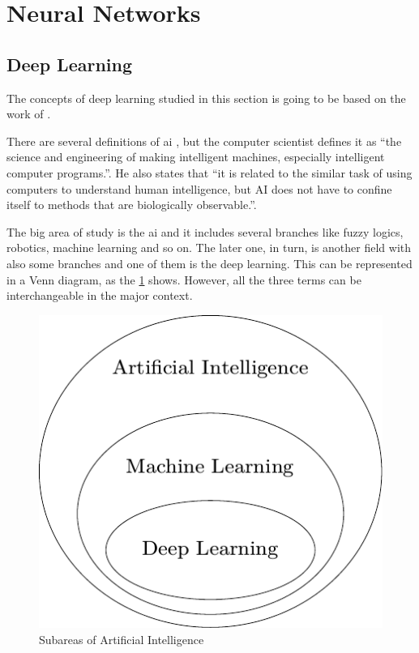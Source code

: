 \section{Neural Networks}

\subsection{Deep Learning}

The concepts of deep learning studied in this section is going to be based on the work of \citet{goodfellow2016}.

There are several definitions of \gls*{ai} \citep{winston1992}, but the  computer scientist \citet{mccarthy2007} defines it as ``the science and engineering of making intelligent machines, especially intelligent computer programs.''.
He also states that ``it is related to the similar task of using computers to understand human intelligence, but AI does not have to confine itself to methods that are biologically observable.''.

The big area of study is the \gls*{ai} and it includes several branches like fuzzy logics, robotics, machine learning and so on. 
The later one, in turn, is another field with also some branches and one of them is the deep learning.
This can be represented in a Venn diagram, as the \cref{fig:venn_dl} shows.
However, all the three terms can be interchangeable in the major context.

\begin{figure}[H]
    \centering
    \includegraphics{figures/2methodology/nn/venn_dl.pdf}
    \caption{Subareas of Artificial Intelligence}
    \label{fig:venn_dl}
\end{figure}

